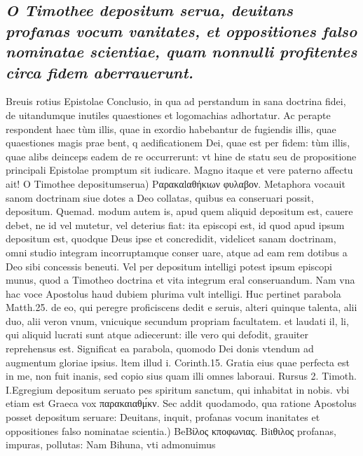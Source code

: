 \documentclass{article}
\begin{document}
\begin{pages}
{}
\subsection*{\textit{O Timothee depositum serua, deuitans profanas vocum vanitates, et oppositiones falso nominatae scientiae, quam nonnulli profitentes circa fidem aberrauerunt. }}\pstart Breuis rotius Epistolae Conclusio, in qua ad perstandum in sana doctrina fidei, de uitandumque inutiles quaestiones et logomachias adhortatur. Ac perapte respondent haec tùm illis, quae in exordio habebantur de fugiendis illis, quae quaestiones magis prae bent, q aedificationem Dei, quae est per fidem: tùm illis, quae alibs deinceps eadem de re occurrerunt: vt hine de statu seu de propositione principali Epistolae promptum sit iudicare. Magno itaque et vere paterno affectu ait!  \pend\pstart O Timothee depositumserua) Pαρακαlαθήκιων φυλαβον. Metaphora vocauit sanom doctrinam siue dotes a Deo collatas, quibus ea conseruari possit, depositum. Quemad. modum autem is, apud quem aliquid depositum est, cauere debet, ne id vel mutetur, vel deterius fiat: ita episcopi est, id quod apud ipsum depositum est, quodque Deus ipse et concredidit, videlicet sanam doctrinam, omni studio integram incorruptamque conser uare, atque ad eam rem dotibus a Deo sibi concessis beneuti. Vel per depositum intelligi potest ipsum episcopi munus, quod a Timotheo doctrina et vita integrum eral conseruandum. Nam vna hac voce Apostolus haud dubiem plurima vult intelligi. Huc pertinet parabola Matth.25. de eo, qui peregre proficiscens dedit e seruis, alteri quinque  talenta, alii duo, alii veron vnum, vnicuique secundum propriam facultatem. et laudati il, li, qui aliquid lucrati sunt atque adiecerunt: ille vero qui defodit, grauiter reprehensus est. Significat ea parabola, quomodo Dei donis vtendum ad augmentum gloriae ipsius. ltem illud i. Corinth.15. Gratia eius quae perfecta est in me, non fuit inanis, sed copio sius quam illi omnes laboraui. Rursus 2. Timoth. I.Egregium depositum seruato pes spiritum sanctum, qui inhabitat in nobis. vbi etiam est Graeca vox παρακαιαθμ́κν. Sec addit quodamodo, qua ratione Apostolus posset depositum seruare:  \pend\pstart Deuitans, inquit, profanas vocum inanitates et oppositiones falso nominatae scientia.) BeΒίλος κποφωνιας. Βiιθιλος profanas, impuras, pollutas: Nam Bihuna, vti admonuimus  \pend

\end{pages}
\end{document}
